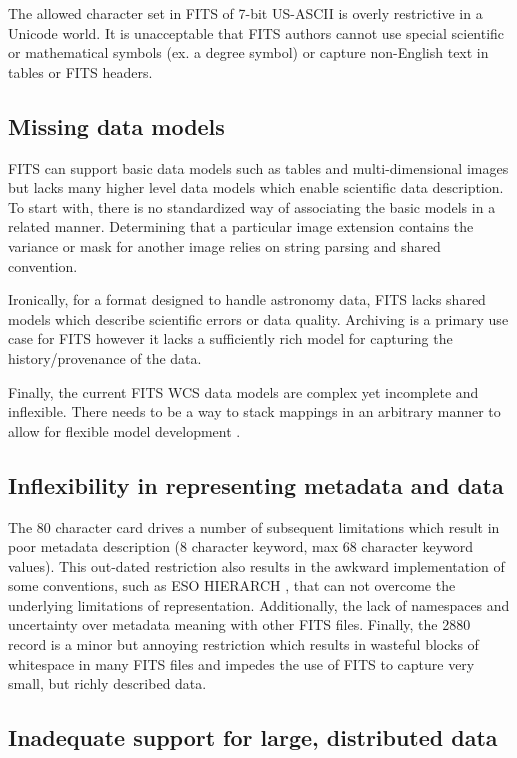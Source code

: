 \documentclass[11pt,twoside]{article}
\begin{document}
The allowed character set in FITS of 7-bit US-ASCII is overly restrictive in a
Unicode world. It is unacceptable that FITS authors cannot use special 
scientific or mathematical symbols (ex. a degree symbol) or capture 
non-English text in tables or FITS headers.

\subsection{Missing data models}

FITS can support basic data models such as tables and multi-dimensional 
images but lacks many higher level data models which enable scientific
data description. To start with, there is no standardized way of associating
the basic models in a related manner. Determining that a particular image 
extension contains the variance or mask for another image relies on string 
parsing and shared convention. 

Ironically, for a format designed to handle astronomy data, FITS lacks shared
models which describe scientific errors or data quality. Archiving is
a primary use case for FITS however it lacks a sufficiently rich model 
for capturing the history/provenance of the data.

Finally, the current FITS WCS data models are complex yet incomplete and
inflexible. There needs to be a way to stack mappings in an arbitrary
manner to allow for flexible model development \citep[see
e.g.][]{1998ASPC..145...41W,2012ASPC..461..825B,O35_adassxxii}.


\subsection{Inflexibility in representing metadata and data}

The 80 character card drives a number of subsequent limitations which
result in poor metadata description (8 character keyword, max 68 character keyword values). 
This out-dated restriction also results in the awkward implementation 
of some conventions, such as ESO HIERARCH \citep{2009Wic}, that can not 
overcome the underlying limitations of representation. Additionally, the lack of 
namespaces and uncertainty over metadata meaning with other FITS files.
Finally, the 2880 record is a minor but annoying restriction which results
in wasteful blocks of whitespace in many FITS files and impedes the use
of FITS to capture very small, but richly described data.

\subsection{Inadequate support for large, distributed data}
\end{document}
